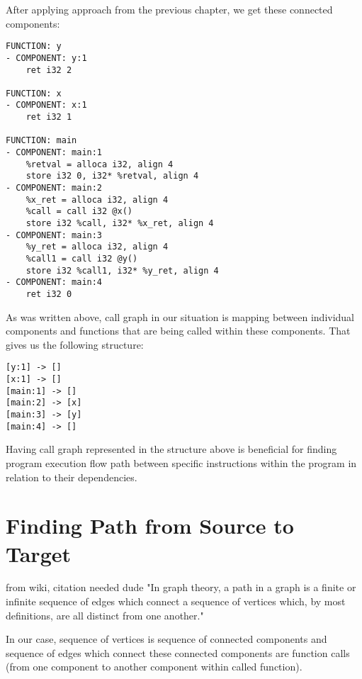 \documentclass[12pt, twoside]{fithesis2}
\renewcommand{\_}{\leavevmode \kern0.07em\vbox{\hrule width0.4em}}
\begin{document}
After applying approach from the previous chapter, we get these connected
components:

\begin{verbatim}
FUNCTION: y
- COMPONENT: y:1
    ret i32 2

FUNCTION: x
- COMPONENT: x:1
    ret i32 1

FUNCTION: main
- COMPONENT: main:1
    %retval = alloca i32, align 4
    store i32 0, i32* %retval, align 4
- COMPONENT: main:2
    %x_ret = alloca i32, align 4
    %call = call i32 @x()
    store i32 %call, i32* %x_ret, align 4
- COMPONENT: main:3
    %y_ret = alloca i32, align 4
    %call1 = call i32 @y()
    store i32 %call1, i32* %y_ret, align 4
- COMPONENT: main:4
    ret i32 0
\end{verbatim}

As was written above, call graph in our situation is mapping between individual
components and functions that are being called within these components. That
gives us the following structure:

\begin{verbatim}
[y:1] -> []
[x:1] -> []
[main:1] -> []
[main:2] -> [x]
[main:3] -> [y]
[main:4] -> []
\end{verbatim}

Having call graph represented in the structure above is beneficial for finding
program execution flow path between specific instructions within the program in
relation to their dependencies.

\section{Finding Path from Source to Target}
\label{sec:design-path}


from wiki, citation needed dude "In graph theory, a path in a graph is a finite
or infinite sequence of edges which connect a sequence of vertices which, by
most definitions, are all distinct from one another."

In our case, sequence of vertices is sequence of connected components and
sequence of edges which connect these connected components are function calls
(from one component to another component within called function).
\end{document}
